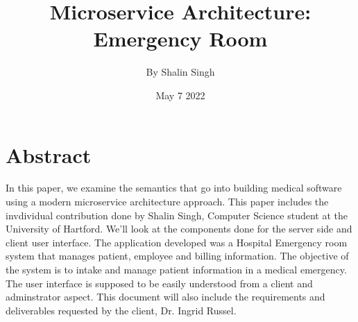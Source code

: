 \documentclass{article}
\title{Microservice Architecture: Emergency Room}
\author{By Shalin Singh}
\date{May 7 2022}
\begin{document}
\maketitle

\section{Abstract}
In this paper, we examine the semantics that go into building medical software using a modern microservice architecture approach. This paper includes the invdividual contribution done by Shalin Singh, Computer Science student at the University of Hartford. We'll look at the components done for the server side and client user interface. The application developed was a Hospital Emergency room system that manages patient, employee and billing information. The objective of the system is to intake and manage patient information in a medical emergency. The user interface is supposed to be easily understood from a client and adminstrator aspect. This document will also include the requirements and deliverables requested by the client, Dr. Ingrid Russel. 
\end{document}

